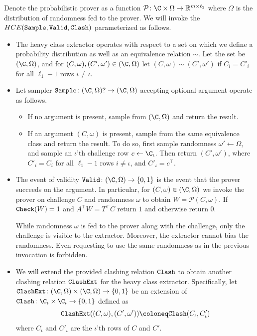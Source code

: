 Denote the probabilistic prover as a function $\mathcal{P}\colon\C\times\Omega\to\R^{m\times\ell_2}$ where $\Omega$ is the distribution of randomness fed to the prover.
We will invoke the  $HCE(\Sample,\Valid,\Clash)$ parameterized as follows.
\begin{itemize}
    \item
    The heavy class extractor operates with respect to a set on which we define a probability distribution as well as an equivalence relation $\sim$.
    Let the set be $(\C,\Omega)$, and for $(C,\omega),(C',\omega')\in(\C,\Omega)$ let $(C,\omega)\sim(C',\omega')$ if $C_i = C'_i$ for all $\ell_1-1$ rows $i\neq\iota$.

    \item
    Let sampler $\Sample\colon(\C,\Omega)?\to(\C,\Omega)$ accepting optional argument operate as follows.
    \begin{itemize}
        \item
        If no argument is present, sample from $(\C,\Omega)$ and return the result.
        \item
        If an argument $(C,\omega)$ is present, sample from the same equivalence class and return the result.
        To do so, first sample randomness $\omega'\leftarrow\Omega$, and sample an $\iota$'th challenge row $c\leftarrow\C_\iota$.
        Then return $(C',\omega')$, where $C'_i=C_i$ for all $\ell_1-1$ rows $i\neq\iota$, and $C'_\iota=c^\intercal$. 
    \end{itemize}

    \item
    The event of validity $\Valid\colon(\C,\Omega)\to\{0,1\}$ is the event that the prover succeeds on the argument.
    In particular, for $(C,\omega)\in(\C,\Omega)$ we invoke the prover on challenge $C$ and randomness $\omega$ to obtain $W = \mathcal{P}(C,\omega)$.
    If $\Check(W)=1$ and $A^\intercal W = T^\intercal C$ return $1$ and otherwise return $0$.

    While randomness $\omega$ is fed to the prover along with the challenge, only the challenge is visible to the extractor.
    Moreover, the extractor cannot bias the randomness.
    Even requesting to use the same randomness as in the previous invocation is forbidden.

    \item
    We will extend the provided clashing relation $\Clash$ to obtain another clashing relation $\ClashExt$ for the heavy class extractor.
    Specifically, let $\ClashExt\colon(\C,\Omega)\times(\C,\Omega)\to\{0,1\}$ be an extension of $\Clash\colon\C_\iota\times\C_\iota\to\{0,1\}$ defined as
    \begin{align}
        \ClashExt((C,\omega),(C',\omega')) \coloneq \Clash(C_\iota,C'_\iota)
    \end{align}
    where $C_\iota$ and $C'_\iota$ are the $\iota$'th rows of $C$ and $C'$.
\end{itemize}

